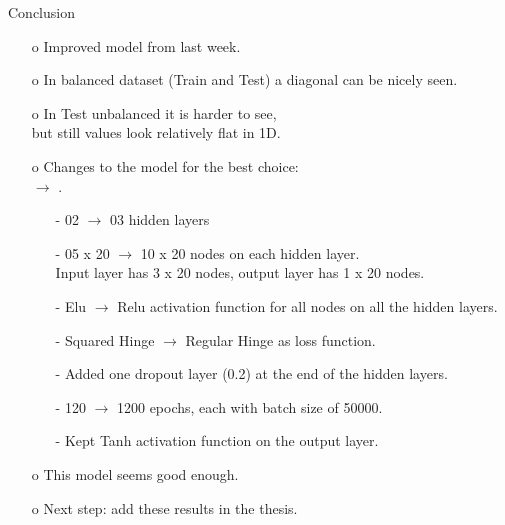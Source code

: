 \documentclass{beamer}
\begin{document}
\begin{frame}{Conclusion}
\begin{enumerate}
\item[o] Improved model from last week.
\item[o] In balanced dataset (Train and Test) a diagonal can be nicely seen.
\item[o] In Test unbalanced it is harder to see, \\ but still values look relatively flat in 1D. 
\item[o] Changes to the model for the best choice: \\ \texttt{} $\rightarrow$ \texttt{}.
\begin{enumerate}
\item[-] 02 $\rightarrow$ 03 hidden layers
\item[-] 05 x 20 $\rightarrow$ 10 x 20 nodes on each hidden layer. \\ Input layer has 3 x 20 nodes, output layer has 1 x 20 nodes.
\item[-] Elu $\rightarrow$ Relu activation function for all nodes on all the hidden layers. 
\item[-] Squared Hinge $\rightarrow$ Regular Hinge as loss function.
\item[-] Added one dropout layer (0.2) at the end of the hidden layers.
\item[-] 120 $\rightarrow$ 1200 epochs, each with batch size of 50000.
\item[-] Kept Tanh activation function on the output layer.
\end{enumerate}
\item[o] This model seems good enough.
\item[o] Next step: add these results in the thesis. 
\end{enumerate}
\end{frame}
\clearpage
\end{document}
